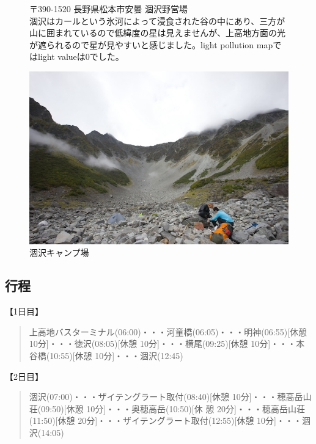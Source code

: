 \documentclass[../main]{subfiles}
\begin{document}
\begin{figure}
\begin{minipage}{0.45\textwidth} %
  〒390-1520 長野県松本市安曇 涸沢野営場 \\

  涸沢はカールという氷河によって浸食された谷の中にあり、三方が山に囲まれているので低緯度の星は見えませんが、上高地方面の光が遮られるので星が見やすいと感じました。light pollution mapではlight valueは0でした。
\end{minipage}%
\hfill
\begin{minipage}{0.45\textwidth} %
    \centering
    \includegraphics[width=\linewidth]{sections/mori/IMG_2413.jpg} %
    \caption{涸沢キャンプ場}
\end{minipage}
\end{figure}

\subsection{行程}
【1日目】
\begin{quote}
  上高地バスターミナル(06:00)・・・河童橋(06:05)・・・明神(06:55)[休憩 10分]・・・徳沢(08:05)[休憩 10分]・・・横尾(09:25)[休憩 10分]・・・本谷橋(10:55)[休憩 10分]・・・涸沢(12:45)
\end{quote}

【2日目】
\begin{quote}
  涸沢(07:00)・・・ザイテングラート取付(08:40)[休憩 10分]・・・穂高岳山荘(09:50)[休憩 10分]・・・奥穂高岳(10:50)[休
  憩 20分]・・・穂高岳山荘(11:50)[休憩 20分]・・・ザイテングラート取付(12:55)[休憩 10分]・・・涸沢(14:05)
\end{quote}
\end{document}
